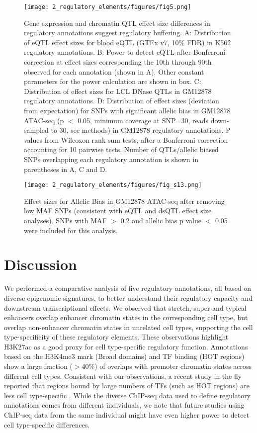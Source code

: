 \begin{figure}
    \centering
    \texttt{[image: 2\_regulatory\_elements/figures/fig5.png]}
    \caption[Gene expression and chromatin QTL effect size differences in regulatory annotations suggest regulatory buffering]{Gene expression and chromatin QTL effect size differences in regulatory annotations suggest regulatory buffering. A: Distribution of eQTL effect sizes for blood eQTL (GTEx v7, 10\% FDR) in K562 regulatory annotations. B: Power to detect eQTL after Bonferroni correction at effect sizes corresponding the 10th through 90th observed for each annotation (shown in A). Other constant parameters for the power calculation are shown in box. C: Distribution of effect sizes for LCL DNase QTLs in GM12878 regulatory annotations. D: Distribution of effect sizes (deviation from expectation) for SNPs with significant allelic bias in GM12878 ATAC-seq (p $<$ 0.05, minimum coverage at SNP=30, reads down-sampled to 30, see methods) in GM12878 regulatory annotations. P values from Wilcoxon rank sum tests, after a Bonferroni correction accounting for 10 pairwise tests. Number of QTLs/allelic biased SNPs overlapping each regulatory annotation is shown in parentheses in A, C and D.}
    \label{fig:c1_f5}
\end{figure}

\begin{figure}
    \centering
    \texttt{[image: 2\_regulatory\_elements/figures/fig\_s13.png]}
    \caption[Effect sizes for Allelic Bias in GM12878 ATAC-seq]{Effect sizes for Allelic Bias in GM12878 ATAC-seq after removing low MAF SNPs (consistent with eQTL and dsQTL effect size analyses). SNPs with MAF $>$ 0.2 and allelic bias p value $<$ 0.05 were included for this analysis.}
    \label{fig:c1_fs13}
\end{figure}

\section{Discussion}
We performed a comparative analysis of five regulatory annotations, all based on diverse epigenomic signatures, to better understand their regulatory capacity and downstream transcriptional effects. We observed that stretch, super and typical enhancers overlap enhancer chromatin states in the corresponding cell type, but overlap non-enhancer chromatin states in unrelated cell types, supporting the cell type-specificity of these regulatory elements. These observations highlight H3K27ac as a good proxy for cell type-specific regulatory function. Annotations based on the H3K4me3 mark (Broad domains) and TF binding (HOT regions) show a large fraction ($>$40\%) of overlaps with promoter chromatin states across different cell types. Consistent with our observations, a recent study in the fly reported that regions bound by large numbers of TFs (such as HOT regions) are less cell type-specific \cite{kudronModERNResourceGenomeWide2017}. While the diverse ChIP-seq data used to define regulatory annotations comes from different individuals, we note that future studies using ChIP-seq data from the same individual might have even higher power to detect cell type-specific differences.\\

